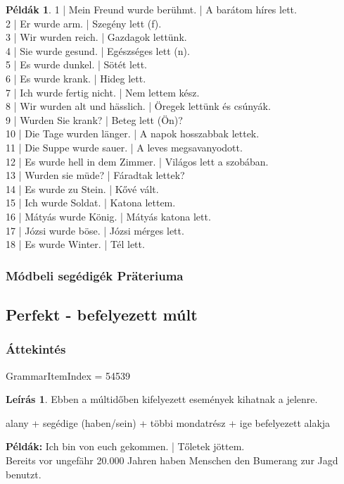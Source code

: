 \documentclass{article}
\theoremstyle{definition}
\newtheorem*{exmp}{Példák}
\newtheorem*{desc}{Leírás}
\begin{document}
\begin{exmp}
1 | Mein Freund wurde berühmt. | A barátom híres lett.\\
2 | Er wurde arm. | Szegény lett (f).\\
3 | Wir wurden reich. | Gazdagok lettünk.\\
4 | Sie wurde gesund. | Egészséges lett (n).\\
5 | Es wurde dunkel. | Sötét lett.\\
6 | Es wurde krank. | Hideg lett.\\
7 | Ich wurde fertig nicht. | Nem lettem kész.\\
8 | Wir wurden alt und hässlich. | Öregek lettünk és csúnyák.\\
9 | Wurden Sie krank? | Beteg lett (Ön)?\\
10 | Die Tage wurden länger. | A napok hosszabbak lettek.\\
11 | Die Suppe wurde sauer. | A leves megsavanyodott.\\
12 | Es wurde hell in dem Zimmer. | Világos lett a szobában.\\
13 | Wurden sie müde? | Fáradtak lettek?\\
14 | Es wurde zu Stein. | Kővé vált.\\
15 | Ich wurde Soldat. | Katona lettem.\\
16 | Mátyás wurde König. | Mátyás katona lett.\\
17 | Józsi wurde böse. | Józsi mérges lett.\\
18 | Es wurde Winter. | Tél lett.\\
\end{exmp}

\subsubsection{Módbeli segédigék Präteriuma}

\subsection{Perfekt - befelyezett múlt}

\subsubsection{Áttekintés}

GrammarItemIndex = 54539

\begin{desc}
Ebben a múltidőben kifelyezett események kihatnak a jelenre.
\begin{center}
alany + segédige (haben/sein) + többi mondatrész + ige befelyezett alakja
\end{center}

\textbf{Példák:} Ich bin von euch gekommen. | Tőletek jöttem.\\
Bereits vor ungefähr 20.000 Jahren haben Menschen den Bumerang zur Jagd benutzt.
\end{desc}
\end{document}
